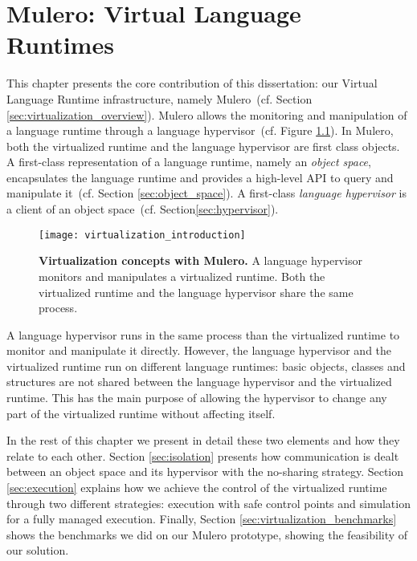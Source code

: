 
\newcommand{\VTT}{Mulero\xspace}
\newcommand{\Vtt}{\VTT}
\newcommand{\VT}{\VTT}
\newcommand{\Vt}{\VTT}

\chapter{\VTT: Virtual Language Runtimes}
\minitoc
\introduction

This chapter presents the core contribution of this dissertation: our Virtual Language Runtime infrastructure, namely \VTT~(cf. Section \ref{sec:virtualization_overview}). \VTT allows the monitoring and manipulation of a language runtime through a language hypervisor~(cf. Figure \ref{fig:virtualization_introduction}). In \VTT, both the virtualized runtime and the language hypervisor are first class objects. A first-class representation of a language runtime, namely an \emph{object space}, encapsulates the language runtime and provides a high-level API to query and manipulate it~(cf. Section \ref{sec:object_space}). A first-class \emph{language hypervisor} is a client of an object space~(cf. Section\ref{sec:hypervisor}).

\begin{figure}[htb]
\begin{center}
\texttt{[image: virtualization\_introduction]}
\caption{\textbf{Virtualization concepts with \Vtt.} A language hypervisor monitors and manipulates a virtualized runtime. Both the virtualized runtime and the language hypervisor share the same process.\label{fig:virtualization_introduction}}
\end{center}
\end{figure}

A language hypervisor runs in the same process than the virtualized runtime to monitor and manipulate it directly. However, the language hypervisor and the virtualized runtime run on different language runtimes: basic objects, classes and \VM structures are not shared between the language hypervisor and the virtualized runtime. This has the main purpose of allowing the hypervisor to change any part of the virtualized runtime without affecting itself.

In the rest of this chapter we present in detail these two elements and how they relate to each other. Section \ref{sec:isolation} presents how communication is dealt between an object space and its hypervisor with the no-sharing strategy. Section \ref{sec:execution} explains how we achieve the control of the virtualized runtime through two different strategies: \VM execution with safe control points and simulation for a fully managed execution. Finally, Section \ref{sec:virtualization_benchmarks} shows the benchmarks we did on our \Vtt prototype, showing the feasibility of our solution.

